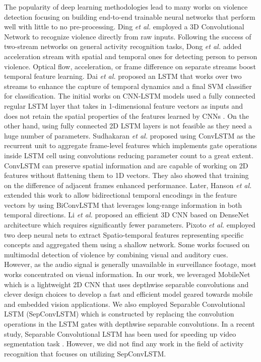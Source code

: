 \documentclass[conference]{IEEEtran}
\begin{document}
The popularity of deep learning methodologies lead to many works on violence detection focusing on building end-to-end trainable neural networks that perform well with little to no pre-processing. Ding \emph{et al.} \cite{ding2014violence} employed a 3D Convolutional Network to recognize violence directly from raw inputs. Following the success of two-stream networks \cite{simonyan2014two} on general activity recognition tasks, Dong \emph{et al.} \cite{dong2016multi} added acceleration stream with spatial and temporal ones for detecting person to person violence. Optical flow, acceleration, or frame difference on separate streams boost temporal feature learning. Dai \emph{et al.} \cite{dai2015fudan} proposed an LSTM that works over two streams to enhance the capture of temporal dynamics and a final SVM classifier for classification. The initial works on CNN-LSTM models used a fully connected regular LSTM layer that takes in 1-dimensional feature vectors as inputs and does not retain the spatial properties of the features learned by CNNs \cite{dong2016multi}. On the other hand, using fully connected 2D LSTM layers is not feasible as they need a huge number of parameters. Sudhakaran \emph{et al.} \cite{sudhakaran2017learning} proposed using ConvLSTM \cite{xingjian2015convolutional} as the recurrent unit to aggregate frame-level features which implements gate operations inside LSTM cell using convolutions reducing parameter count to a great extent. ConvLSTM can preserve spatial information and are capable of working on 2D features without flattening them to 1D vectors. They also showed that training on the difference of adjacent frames enhanced performance. Later, Hanson \emph{et al.} \cite{hanson2018bidirectional} extended this work to allow bidirectional temporal encodings in the feature vectors by using BiConvLSTM that leverages long-range information in both temporal directions. Li \emph{et al.} \cite{li2019efficient} proposed an efficient 3D CNN based on DenseNet \cite{huang2018densely} architecture which requires significantly fewer parameters. Pixoto \emph{et al.} employed two deep neural nets to extract Spatio-temporal features representing specific concepts and aggregated them using a shallow network. Some works \cite{wu2020not, peixoto2020multimodal} focused on multimodal detection of violence by combining visual and auditory cues. However, as the audio signal is generally unavailable in surveillance footage, most works concentrated on visual information. In our work, we leveraged MobileNet \cite{mobilenet} which is a lightweight 2D CNN that uses depthwise separable convolutions and clever design choices to develop a fast and efficient model geared towards mobile and embedded vision applications. We also employed Separable Convolutional LSTM (SepConvLSTM) which is constructed by replacing the convolution operations in the LSTM gates with depthwise separable convolutions. In a recent study, Separable Convolutional LSTM has been used for speeding up video segmentation task \cite{pfeuffer2019separable}. However, we did not find any work in the field of activity recognition that focuses on utilizing SepConvLSTM.
\end{document}
